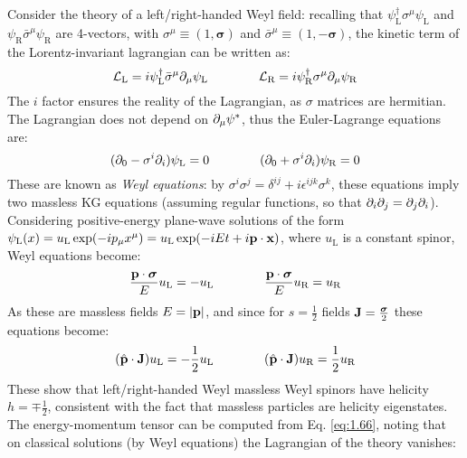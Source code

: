 Consider the theory of a left/right-handed Weyl field: recalling that $ \psi_\text{L}^\dagger \sigma^\mu \psi_\text{L} $ and $ \psi_\text{R} \bar{\sigma}^\mu \psi_\text{R} $ are 4-vectors, with $ \sigma^\mu \equiv (1, \boldsymbol{\sigma}) $ and $ \bar{\sigma}^\mu \equiv (1, - \boldsymbol{\sigma}) $, the kinetic term of the Lorentz-invariant lagrangian can be written as:
\begin{equation}
  \mathcal{L}_\text{L} = i \psi_\text{L}^\dagger \bar{\sigma}^\mu \partial_\mu \psi_\text{L}
  \qquad \qquad
  \mathcal{L}_\text{R} = i \psi_\text{R}^\dagger \sigma^\mu \partial_\mu \psi_\text{R}
  \label{eq:1.84}
\end{equation}
The $ i $ factor ensures the reality of the Lagrangian, as $ \sigma $ matrices are hermitian. The Lagrangian does not depend on $ \partial_\mu \psi^* $, thus the Euler-Lagrange equations are:
\begin{equation}
  (\partial_0 - \sigma^i \partial_i) \psi_\text{L} = 0
  \qquad \qquad
  (\partial_0 + \sigma^i \partial_i) \psi_\text{R} = 0
  \label{eq:1.85}
\end{equation}
These are known as \textit{Weyl equations}: by $ \sigma^i \sigma^j = \delta^{ij} + i \epsilon^{ijk} \sigma^k $, these equations imply two massless KG equations (assuming regular functions, so that $ \partial_i \partial_j = \partial_j \partial_i $). Considering positive-energy plane-wave solutions of the form $ \psi_\text{L}(x) = u_\text{L} \exp(-i p_\mu x^\mu) = u_\text{L} \exp(-i E t + i \mathbf{p} \cdot \mathbf{x}) $, where $ u_\text{L} $ is a constant spinor, Weyl equations become:
\begin{equation*}
  \frac{\mathbf{p} \cdot \boldsymbol{\sigma}}{E} u_\text{L} = - u_\text{L}
  \qquad \qquad
  \frac{\mathbf{p} \cdot \boldsymbol{\sigma}}{E} u_\text{R} = u_\text{R}
\end{equation*}
As these are massless fields $ E = \left\lvert\mathbf{p}\right\rvert $, and since for $ s = \frac{1}{2} $ fields $ \mathbf{J} = \frac{\boldsymbol{\sigma}}{2} $ these equations become:
\begin{equation*}
  (\hat{\mathbf{p}} \cdot \mathbf{J}) u_\text{L} = - \frac{1}{2} u_\text{L}
  \qquad \qquad
  (\hat{\mathbf{p}} \cdot \mathbf{J}) u_\text{R} = \frac{1}{2} u_\text{R}
\end{equation*}
These show that left/right-handed Weyl massless Weyl spinors have helicity $ h = \mp \frac{1}{2} $, consistent with the fact that massless particles are helicity eigenstates.\\
The energy-momentum tensor can be computed from Eq. \ref{eq:1.66}, noting that on classical solutions (by Weyl equations) the Lagrangian of the theory vanishes:
